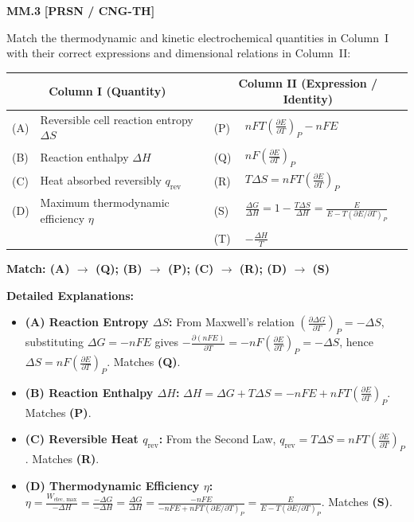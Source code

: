 \begin{problembox}
\textbf{MM.3} \hfill \textbf{[PRSN / CNG-TH]}

Match the thermodynamic and kinetic electrochemical quantities in Column~I with their correct expressions and dimensional relations in Column~II:

\begin{center}
\begin{tabular}{p{}p{}|p{}p{}}
\toprule
\multicolumn{2}{c|}{\textbf{Column I (Quantity)}} & \multicolumn{2}{c}{\textbf{Column II (Expression / Identity)}} \\
\midrule
(A) & Reversible cell reaction entropy $\Delta S$ & (P) & $nFT\left(\frac{\partial E}{\partial T}\right)_P - nFE$ \\
(B) & Reaction enthalpy $\Delta H$ & (Q) & $nF \left(\frac{\partial E}{\partial T}\right)_P$ \\
(C) & Heat absorbed reversibly $q_{\text{rev}}$ & (R) & $T \Delta S = nFT \left(\frac{\partial E}{\partial T}\right)_P$ \\
(D) & Maximum thermodynamic efficiency $\eta$ & (S) & $\frac{\Delta G}{\Delta H} = 1 - \frac{T\Delta S}{\Delta H} = \frac{E}{E - T(\partial E/\partial T)_P}$ \\
    & & (T) & $-\frac{\Delta H}{T}$ \\
\bottomrule
\end{tabular}
\end{center}
\end{problembox}
\begin{solution}
\textbf{Match: (A) $\to$ (Q); (B) $\to$ (P); (C) $\to$ (R); (D) $\to$ (S)}

\textbf{Detailed Explanations:}
\begin{itemize}
    \item \textbf{(A) Reaction Entropy $\Delta S$:} From Maxwell's relation $\left(\frac{\partial \Delta G}{\partial T}\right)_P = -\Delta S$, substituting $\Delta G = -nFE$ gives $-\frac{\partial(nFE)}{\partial T} = -nF\left(\frac{\partial E}{\partial T}\right)_P = -\Delta S$, hence $\Delta S = nF\left(\frac{\partial E}{\partial T}\right)_P$. Matches \textbf{(Q)}.
    \item \textbf{(B) Reaction Enthalpy $\Delta H$:} $\Delta H = \Delta G + T\Delta S = -nFE + nFT\left(\frac{\partial E}{\partial T}\right)_P$. Matches \textbf{(P)}.
    \item \textbf{(C) Reversible Heat $q_{\text{rev}}$:} From the Second Law, $q_{\text{rev}} = T\Delta S = nFT\left(\frac{\partial E}{\partial T}\right)_P$. Matches \textbf{(R)}.
    \item \textbf{(D) Thermodynamic Efficiency $\eta$:} $\eta = \frac{W_{\text{elec, max}}}{-\Delta H} = \frac{-\Delta G}{-\Delta H} = \frac{\Delta G}{\Delta H} = \frac{-nFE}{-nFE + nFT(\partial E/\partial T)_P} = \frac{E}{E - T(\partial E/\partial T)_P}$. Matches \textbf{(S)}.
\end{itemize}
\end{solution}

